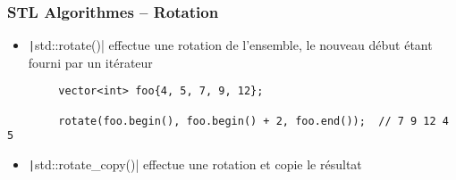 \documentclass[C++.tex]{subfiles}
\begin{document}
\begin{frame}[fragile]
	\frametitle{STL Algorithmes -- Rotation}
	\begin{itemize}
		\item \texttt|std::rotate()| effectue une rotation de l'ensemble, le nouveau début étant fourni par un itérateur
	\end{itemize}

	\begin{verbatim}
		vector<int> foo{4, 5, 7, 9, 12};

		rotate(foo.begin(), foo.begin() + 2, foo.end());  // 7 9 12 4 5
	\end{verbatim}

	\begin{itemize}
		\item \texttt|std::rotate_copy()| effectue une rotation et copie le résultat
	\end{itemize}

\end{frame}
\end{document}
